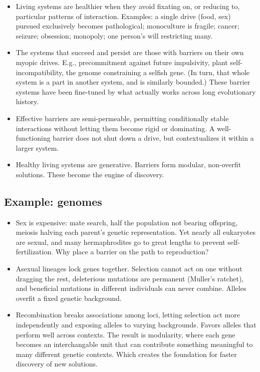 \documentclass[11pt]{article}
\begin{document}
\begin{itemize}
  \item Living systems are healthier when they avoid fixating on, or reducing to, particular patterns of interaction. Examples: a single drive (food, sex) pursued exclusively becomes pathological; monoculture is fragile; cancer; seizure; obsession; monopoly; one person's will restricting many. 
  \item The systems that succeed and persist are those with barriers on their own myopic drives. E.g., precommitment against future impulsivity, plant self-incompatibility, the genome constraining a selfish gene. (In turn, that whole system is a part in another system, and is similarly bounded.) These barrier systems have been fine-tuned by what actually works across long evolutionary history.
  \item Effective barriers are semi-permeable, permitting conditionally stable interactions without letting them become rigid or dominating. A well-functioning barrier does not shut down a drive, but contextualizes it within a larger system.
  \item Healthy living systems are generative. Barriers form modular, non-overfit solutions. These become the engine of discovery.
\end{itemize}


\subsection*{Example: genomes}

\begin{itemize}
  \item Sex is expensive: mate search, half the population not bearing offspring, meiosis halving each parent's genetic representation. Yet nearly all eukaryotes are sexual, and many hermaphrodites go to great lengths to prevent self-fertilization. Why place a barrier on the path to reproduction?
  \item Asexual lineages lock genes together. Selection cannot act on one without dragging the rest, deleterious mutations are permanent (Muller's ratchet), and beneficial mutations in different individuals can never combine. Alleles overfit a fixed genetic background.
  \item Recombination breaks associations among loci, letting selection act more independently and exposing alleles to varying backgrounds. Favors alleles that perform well across contexts. The result is modularity, where each gene becomes an interchangable unit that can contribute something meaningful to many different genetic contexts. Which creates the foundation for faster discovery of new solutions.
\end{itemize}
\end{document}
